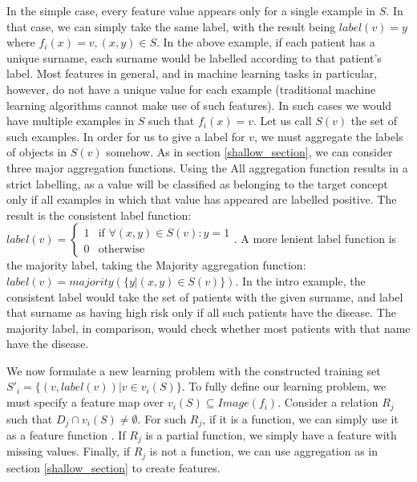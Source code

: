 \documentclass[twoside,11pt]{article}
\theoremstyle{definition}
\begin{document}
In the simple case, every feature value appears only for a single example in $S$. In that case, we can simply take the same label, with the result being $label(v)=y$ where $f_i(x)=v,(x,y)\in S$. In the above example, if each patient has a unique surname, each surname would be labelled according to that patient's label.
Most features in general, and in machine learning tasks in particular, however, do not have a unique value for each example (traditional machine learning algorithms cannot make use of such features). In such cases we would have multiple examples in $S$ such that $f_i(x)=v$. Let us call $S(v)$ the set of such examples. In order for us to give a label for $v$, we must aggregate the labels of objects in $S(v)$ somehow. As in section \ref{shallow_section}, we can consider three major aggregation functions.
Using the All aggregation function results in a strict labelling, as a value will be classified as belonging to the target concept only if all examples in which that value has appeared are labelled positive. The result is the consistent label function: $label(v)=\begin{cases} 1 &\mbox{if } \forall (x,y)\in S(v): y=1\\ 
0 & \mbox{otherwise } \end{cases}$.
 A more lenient label function is the majority label, taking the Majority aggregation function: $label(v)=majority(\{y|(x,y)\in S(v)\})$.
 In the intro example, the consistent label would take the set of patients with the given surname, and label that surname as having high risk only if all such patients have the disease. The majority label, in comparison, would check whether most patients with that name have the disease.
 
We now formulate a new learning problem with the constructed training set
$S'_i = \{ (v, label(v)) | v \in v_i(S) \}$.
To fully define our learning problem, we must specify a feature map over $v_i(S)\subseteq Image(f_i)$. Consider a relation $R_j$ such that $D_j\cap v_i(S)\neq \emptyset$. For such $R_j$, if it is a function, we can simply use it as a feature function%
. If $R_j$ is a partial function, we simply have a feature with missing values. Finally, if $R_j$ is not a function, we can use aggregation as in section \ref{shallow_section} to create features.
\end{document}

